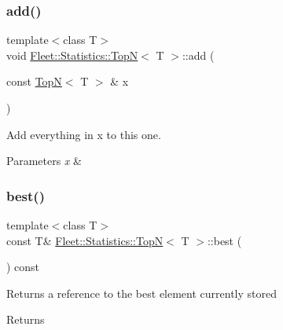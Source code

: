 \subsubsection{\texorpdfstring{add()}{add()}\hspace{0.1cm}{\footnotesize\ttfamily [2/2]}}
{\footnotesize\ttfamily template$<$class T$>$ \\
void \hyperlink{class_fleet_1_1_statistics_1_1_top_n}{Fleet\+::\+Statistics\+::\+TopN}$<$ T $>$\+::add (\begin{DoxyParamCaption}\item[{const \hyperlink{class_fleet_1_1_statistics_1_1_top_n}{TopN}$<$ T $>$ \&}]{x }\end{DoxyParamCaption})\hspace{0.3cm}{\ttfamily [inline]}}

Add everything in x to this one. 
\begin{DoxyParams}{Parameters}
{\em x} & \\
\hline
\end{DoxyParams}
\mbox{\label{class_fleet_1_1_statistics_1_1_top_n_aeab09f4da77161e1743d03780eb4d6b8}} 
\subsubsection{\texorpdfstring{best()}{best()}}
{\footnotesize\ttfamily template$<$class T$>$ \\
const T\& \hyperlink{class_fleet_1_1_statistics_1_1_top_n}{Fleet\+::\+Statistics\+::\+TopN}$<$ T $>$\+::best (\begin{DoxyParamCaption}{ }\end{DoxyParamCaption}) const\hspace{0.3cm}{\ttfamily [inline]}}

Returns a reference to the best element currently stored \begin{DoxyReturn}{Returns}

\end{DoxyReturn}
\mbox{\label{class_fleet_1_1_statistics_1_1_top_n_ab57188b1858802dcf1f26dbcf702c6ae}} 
